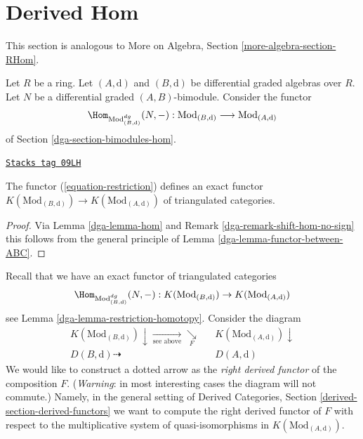 \section{Derived Hom}
\label{dga-section-restriction}
This section is analogous to
More on Algebra, Section \ref{more-algebra-section-RHom}.

\medskip\noindent
Let $R$ be a ring. Let $(A, \text{d})$ and $(B, \text{d})$
be differential graded algebras over $R$. Let $N$ be a
differential graded $(A, B)$-bimodule. Consider the functor
\begin{equation}
\label{equation-restriction}
\Hom_{\text{Mod}^{dg}_{(B, \text{d})}}(N, -) :
\text{Mod}_{(B, \text{d})}
\longrightarrow
\text{Mod}_{(A, \text{d})}
\end{equation}
of Section \ref{dga-section-bimodules-hom}.

\begin{lemma}
\label{dga-lemma-restriction-homotopy}
\href{https://stacks.math.columbia.edu/tag/09LH}{\texttt{Stacks tag 09LH}}

The functor (\ref{equation-restriction}) defines an exact functor
$K(\text{Mod}_{(B, \text{d})}) \to K(\text{Mod}_{(A, \text{d})})$
of triangulated categories.
\end{lemma}

\begin{proof}

Via Lemma \ref{dga-lemma-hom} and
Remark \ref{dga-remark-shift-hom-no-sign}
this follows from the general principle of
Lemma \ref{dga-lemma-functor-between-ABC}.
\end{proof}

Recall that we have an exact functor
of triangulated categories
$$
\Hom_{\text{Mod}^{dg}_{(B, \text{d})}}(N, -) :
K(\text{Mod}_{(B, \text{d})}) \to K(\text{Mod}_{(A, \text{d})})
$$
see Lemma \ref{dga-lemma-restriction-homotopy}. Consider the diagram
$$
\begin{array}{ccc}K(\text{Mod}_{(B, \text{d})}) \downarrow\underset{\text{see above}}{\longrightarrow}\underset{F}{\searrow} &  & K(\text{Mod}_{(A, \text{d})}) \downarrow \\ D(B, \text{d}) \dashrightarrow &  & D(A, \text{d})\end{array}
$$
We would like to construct a dotted arrow as the
{\it right derived functor} of the composition $F$.
({\it Warning}: in most interesting cases the diagram will not commute.)
Namely, in the general setting of
Derived Categories, Section \ref{derived-section-derived-functors}
we want to compute the
right derived functor of $F$ with respect to the multiplicative system of
quasi-isomorphisms in $K(\text{Mod}_{(A, \text{d})})$.

